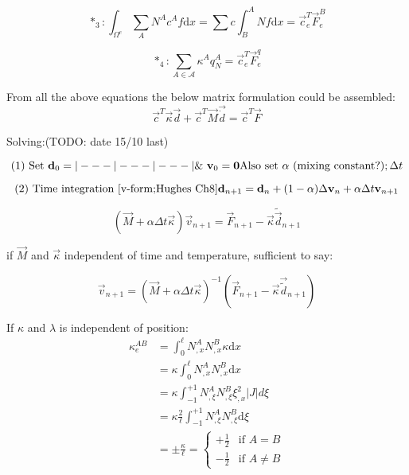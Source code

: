 \begin{equation*}
*_3: \int_{\Omega^e} \sum_A N^A c^A f \text{d}x = \sum c \int_B^A N f \text{d}x = \vec{c}_e^T \vec{F}_e^B
\end{equation*}


\begin{equation*}
*_4: \sum_{A \in \mathcal{A}} \kappa^A q_N^A = \vec{c}_e^T \vec{F}_e^q
\end{equation*}


From all the above equations the below matrix formulation could be assembled:
\begin{equation}%
\vec{c}^T \vec{\kappa} \vec{d} + \vec{c}^T \vec{M} \vec{\dot{d}} = \vec{c}^T \vec{F}
\end{equation}


Solving:(TODO: date 15/10 last)

\begin{equation}
(1) \text{ Set } \vec{d}_0 = |---|---|---| \\
\&\ \vec{v}_0 = \vec{0} \\
\text{Also set } \alpha \text{ (mixing constant?)} ; \Delta t
\end{equation}


\begin{equation}
(2) \text{ Time integration [v-form;Hughes Ch8]} \\
\vec{d}_{n+1} = \vec{d}_n + (1-\alpha) \Delta \vec{v}_n + \alpha \Delta t \vec{v}_{n+1}
\end{equation}


\begin{equation}
(\vec{M} + \alpha\Delta t \vec{\kappa})\vec{v}_{n+1} = \vec{F}_{n+1} - \vec{\kappa} \tilde{\vec{d}}_{n+1}
\end{equation}


if $\vec{M}$ and $\vec{\kappa}$ independent of time and temperature, sufficient to say:

\begin{equation}
\vec{v}_{n+1} = (\vec{M}+\alpha\Delta t \vec{\kappa})^{-1} (\vec{F}_{n+1} - \vec{\kappa} \vec{\tilde{d}}_{n+1})
\end{equation}

If $\kappa$ and $\lambda$ is independent of position:
\begin{equation}
\begin{aligned}
	\kappa_e^{AB} &= \int_0^\ell N_{,x}^A N_{,x}^B \kappa \text{d}x \\
&= \kappa \int_0^\ell N_{,x}^A N_{,x}^B \text{d}x \\
&= \kappa \int_{-1}^{+1} N_{,\xi}^A N_{,\xi}^B \xi_{,x}^2 \left|J\right|  d\xi \\
&=\kappa \frac{2}{\ell} \int_{-1}^{+1} N_{,\xi}^A N_{,\xi}^B \text{d}\xi\\
&= \pm \frac{\kappa}{\ell} = \begin{cases}
+\frac{1}{2} & \text{if } A = B \\
-\frac{1}{2} & \text{if } A \ne B
\end{cases}
\end{aligned}
\end{equation}


